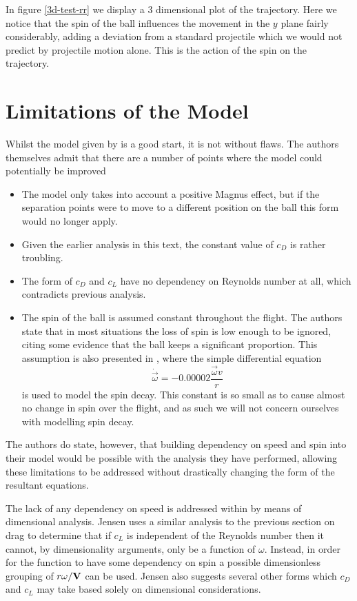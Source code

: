 In figure \ref{3d-test-rr} we display a 3 dimensional plot of the trajectory. Here we notice that 
the spin of the ball influences the movement in the $y$ plane fairly considerably, adding a deviation
from a standard projectile which we would not predict by projectile motion alone. This is the action
of the spin on the trajectory.

\section{Limitations of the Model}

Whilst the model given by \citet{Robinson2013} is a good start, it is not without flaws. The authors
themselves admit that there are a number of points where the model could potentially be improved
\begin{itemize}
\item The model only takes into account a positive Magnus effect, but if the separation points were
to move to a different position on the ball this form would no longer apply.
\item Given the earlier analysis in this text, the constant value of $c_D$ is rather troubling.
\item The form of $c_D$ and $c_L$ have no dependency on Reynolds number at all, which contradicts previous
analysis.
\item The spin of the ball is assumed constant throughout the flight. The authors state that in most
situations the loss of spin is low enough to be ignored, citing some evidence that the ball keeps a
significant proportion. This assumption is also presented in \citet{Lieberman2001}, where the simple
differential equation
\[
\dot{\vec{\omega}} = -0.00002 \frac{\vec{\omega} v}{r}
\]
is used to model the spin decay. This constant is so small as to cause almost no change in spin over
the flight, and as such we will not concern ourselves with modelling spin decay.
\end{itemize}

The authors do state, however, that building dependency on speed and spin into their model would be
possible with the analysis they have performed, allowing these limitations to be addressed without 
drastically changing the form of the resultant equations.

The lack of any dependency on speed is addressed within \citet{Jensen2014Comment} by means of dimensional
analysis. Jensen uses a similar analysis to the previous section on drag to determine that if $c_L$ is
independent of the Reynolds number then it cannot, by dimensionality arguments, only be a function of
$\omega$. Instead, in order for the function to have some dependency on spin a possible dimensionless grouping
of $r\omega/\mathbf{V}$ can be used. Jensen also suggests several other forms which $c_D$ and $c_L$ may take
based solely on dimensional considerations.

